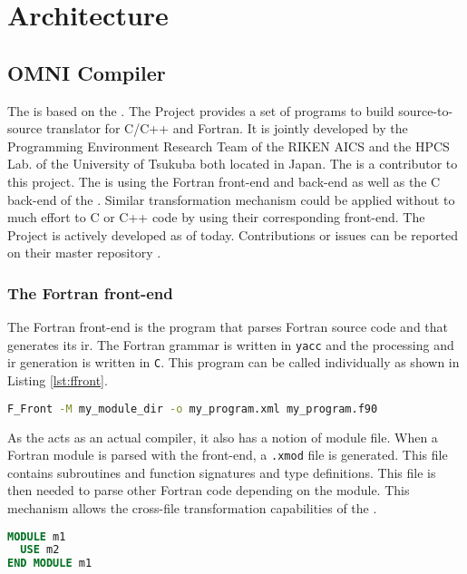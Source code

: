 \chapter{Architecture}
\section{OMNI Compiler}
The \clawfcomp is based on the \omni\cite{omni:website}. The \omni Project
provides a set of programs to build source-to-source translator for C/C++
and Fortran. It is jointly developed by the Programming Environment Research
Team of the RIKEN AICS and the HPCS Lab. of the University of Tsukuba both
located in Japan. The \clawfcomp is a contributor to this project.
The \clawfcomp is using the Fortran front-end and back-end as well as the
C back-end of the \omni. Similar transformation mechanism could be
applied without to much effort to C or C++ code by using their corresponding
front-end. The \omni Project is actively developed as of today. Contributions or
issues can be reported on their master repository \cite{omni:github}.

\subsection{The Fortran front-end}
The Fortran front-end is the program that parses Fortran source code and that
generates its \gls{ir}. The Fortran grammar is written in \lstinline|yacc| and
the processing and \gls{ir} generation is written in \lstinline|C|. This program
can be called individually as shown in Listing \ref{lst:ffront}.

\begin{lstlisting}[label=lst:ffront, language=Bash, caption=Call F\_Front]
F_Front -M my_module_dir -o my_program.xml my_program.f90
\end{lstlisting}

As the \omni acts as an actual compiler, it also has a notion of module file.
When a Fortran module is parsed with the front-end, a \lstinline|.xmod| file is
generated. This file contains subroutines and function signatures and
type definitions. This file is then needed to parse other Fortran code depending
on the module. This mechanism allows the cross-file transformation capabilities
of the \clawfcomp.

\begin{lstlisting}[label=lst:m1, language=Fortran, caption=module\_m1.f90]
MODULE m1
  USE m2
END MODULE m1
\end{lstlisting}

